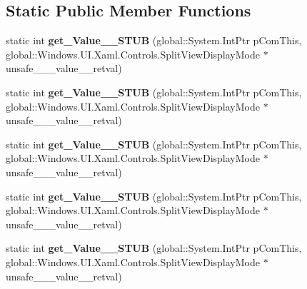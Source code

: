 \subsection*{Static Public Member Functions}
\begin{DoxyCompactItemize}
\item 
\mbox{\label{struct_system_1_1_nullable___a___windows___u_i___xaml___controls___split_view_display_mode___v_______impl_1_1_vtbl_ad3c57b3e54520bee011dd20232479304}} 
static int {\bfseries get\+\_\+\+Value\+\_\+\+\_\+\+S\+T\+UB} (global\+::\+System.\+Int\+Ptr p\+Com\+This, global\+::\+Windows.\+U\+I.\+Xaml.\+Controls.\+Split\+View\+Display\+Mode $\ast$unsafe\+\_\+\+\_\+\+\_\+value\+\_\+\+\_\+retval)
\item 
\mbox{\label{struct_system_1_1_nullable___a___windows___u_i___xaml___controls___split_view_display_mode___v_______impl_1_1_vtbl_ad3c57b3e54520bee011dd20232479304}} 
static int {\bfseries get\+\_\+\+Value\+\_\+\+\_\+\+S\+T\+UB} (global\+::\+System.\+Int\+Ptr p\+Com\+This, global\+::\+Windows.\+U\+I.\+Xaml.\+Controls.\+Split\+View\+Display\+Mode $\ast$unsafe\+\_\+\+\_\+\+\_\+value\+\_\+\+\_\+retval)
\item 
\mbox{\label{struct_system_1_1_nullable___a___windows___u_i___xaml___controls___split_view_display_mode___v_______impl_1_1_vtbl_ad3c57b3e54520bee011dd20232479304}} 
static int {\bfseries get\+\_\+\+Value\+\_\+\+\_\+\+S\+T\+UB} (global\+::\+System.\+Int\+Ptr p\+Com\+This, global\+::\+Windows.\+U\+I.\+Xaml.\+Controls.\+Split\+View\+Display\+Mode $\ast$unsafe\+\_\+\+\_\+\+\_\+value\+\_\+\+\_\+retval)
\item 
\mbox{\label{struct_system_1_1_nullable___a___windows___u_i___xaml___controls___split_view_display_mode___v_______impl_1_1_vtbl_ad3c57b3e54520bee011dd20232479304}} 
static int {\bfseries get\+\_\+\+Value\+\_\+\+\_\+\+S\+T\+UB} (global\+::\+System.\+Int\+Ptr p\+Com\+This, global\+::\+Windows.\+U\+I.\+Xaml.\+Controls.\+Split\+View\+Display\+Mode $\ast$unsafe\+\_\+\+\_\+\+\_\+value\+\_\+\+\_\+retval)
\item 
\mbox{\label{struct_system_1_1_nullable___a___windows___u_i___xaml___controls___split_view_display_mode___v_______impl_1_1_vtbl_ad3c57b3e54520bee011dd20232479304}} 
static int {\bfseries get\+\_\+\+Value\+\_\+\+\_\+\+S\+T\+UB} (global\+::\+System.\+Int\+Ptr p\+Com\+This, global\+::\+Windows.\+U\+I.\+Xaml.\+Controls.\+Split\+View\+Display\+Mode $\ast$unsafe\+\_\+\+\_\+\+\_\+value\+\_\+\+\_\+retval)
\end{DoxyCompactItemize}
